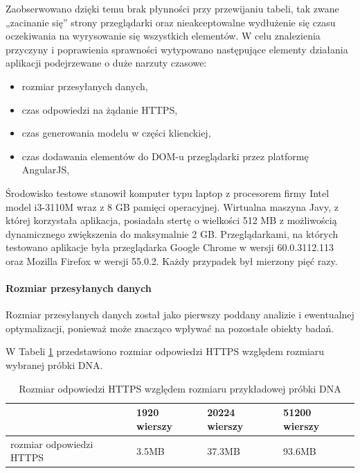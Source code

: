 \documentclass[a4paper,12pt,twoside]{article}
\begin{document}
Zaobserwowano dzięki temu brak płynności przy przewijaniu tabeli, tak zwane „zacinanie się” strony przeglądarki oraz nieakceptowalne wydłużenie się
czasu oczekiwania na wyrysowanie się wszystkich elementów.
W celu znalezienia przyczyny i poprawienia sprawności
wytypowano następujące elementy działania aplikacji podejrzewane o duże narzuty czasowe:

\begin{itemize}
\item rozmiar przesyłanych danych,
\item czas odpowiedzi na żądanie HTTPS,
\item czas generowania modelu w części klienckiej,
\item czas dodawania elementów do DOM-u przeglądarki przez platformę AngularJS,
\end{itemize}

Środowisko testowe stanowił komputer typu laptop z
procesorem firmy Intel model i3-3110M wraz z 8 GB pamięci operacyjnej.
Wirtualna maszyna Javy, z której korzystała aplikacja, posiadała stertę
o wielkości 512 MB z możliwością dynamicznego zwiększenia do maksymalnie 2 GB.
Przeglądarkami, na których testowano aplikacje była przeglądarka
Google Chrome w wersji 60.0.3112.113 oraz Mozilla Firefox w wersji 55.0.2.
Każdy przypadek był mierzony pięć razy.
\newpage
\paragraph{Rozmiar przesyłanych danych}
Rozmiar przesyłanych danych został jako pierwszy poddany analizie i
ewentualnej optymalizacji, ponieważ może znacząco wpływać na pozostałe
obiekty badań.

W Tabeli \ref{table:requestSizeNoOpt} przedstawiono rozmiar
odpowiedzi HTTPS względem rozmiaru wybranej próbki DNA.

\begin{center}
\begin{table} [H]
\begin{tabular}{| p{4cm} | p{2.7cm} | p{2.7cm} | p{2.7cm}|}
\hline
& 1920 wierszy & 20224 wierszy & 51200 wierszy\\
\hline
rozmiar odpowiedzi HTTPS& 3.5MB&37.3MB& 93.6MB\\ \hline
\end{tabular}

\caption{Rozmiar odpowiedzi HTTPS względem rozmiaru przykładowej próbki DNA}
\label{table:requestSizeNoOpt}
\end{table}
\end{center}
\end{document}

